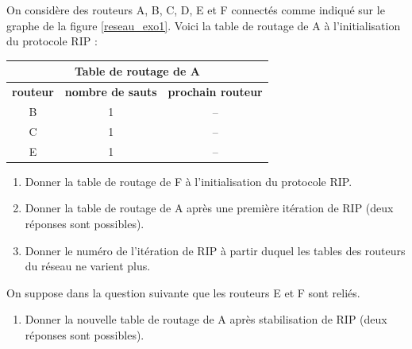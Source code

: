 \par 
\begin{minipage}{0.48\linewidth}
    On considère des routeurs A, B, C, D, E et F connectés comme indiqué sur le graphe de la figure \ref{reseau_exo1}.
\medskip 
Voici la table de routage de A à l’initialisation du protocole RIP :

\end{minipage}\hfill{}
\begin{minipage}{0.52\linewidth}
    \centering
    \renewcommand{\arraystretch}{1.5} %
    \begin{tabular}{|c|c|c|}
        \hline
        \multicolumn{3}{|c|}{\textbf{Table de routage de A}} \\
        \hline
        \textbf{routeur} & \textbf{nombre de sauts} & \textbf{prochain routeur} \\
        \hline
        B & 1 & -- \\
        \hline
        C & 1 & -- \\
        \hline
        E & 1 & -- \\
        \hline
    \end{tabular}
\end{minipage}



\begin{enumerate}[series=monDS, resume]
    \item Donner la table de routage de F à l’initialisation du protocole RIP.

    \medskip

    \item Donner la table de routage de A après une première itération de RIP (deux réponses sont possibles).
    
    \medskip
    \item Donner le numéro de l’itération de RIP à partir duquel les tables des routeurs du réseau ne varient plus. \hfill 
\end{enumerate}

\medskip

On suppose dans la question suivante que les routeurs E et F sont reliés.

\begin{enumerate}[series=monDS, resume]
    \item Donner la nouvelle table de routage de A après stabilisation de RIP (deux réponses sont possibles).

\end{enumerate}

